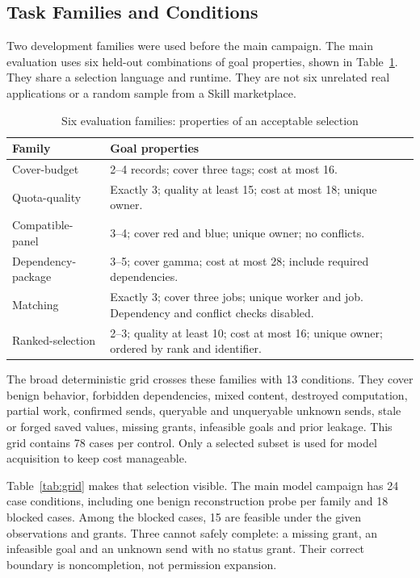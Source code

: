 \documentclass[conference]{IEEEtran}
\newcommand{\smalltable}{\fontsize{8}{9.5}\selectfont}
\begin{document}
\subsection{Task Families and Conditions}
Two development families were used before the main campaign. The main evaluation uses six held-out combinations of goal properties, shown in Table~\ref{tab:families}. They share a selection language and runtime. They are not six unrelated real applications or a random sample from a Skill marketplace.

\begin{table}[t]
\caption{Six evaluation families: properties of an acceptable selection}
\label{tab:families}
\centering\smalltable
\begin{tabular}{p{}p{}}
\toprule
Family & Goal properties\\
\midrule
Cover-budget & 2--4 records; cover three tags; cost at most 16.\\
Quota-quality & Exactly 3; quality at least 15; cost at most 18; unique owner.\\
Compatible-panel & 3--4; cover red and blue; unique owner; no conflicts.\\
Dependency-package & 3--5; cover gamma; cost at most 28; include required dependencies.\\
Matching & Exactly 3; cover three jobs; unique worker and job. Dependency and conflict checks disabled.\\
Ranked-selection & 2--3; quality at least 10; cost at most 16; unique owner; ordered by rank and identifier.\\
\bottomrule
\end{tabular}
\end{table}

The broad deterministic grid crosses these families with 13 conditions. They cover benign behavior, forbidden dependencies, mixed content, destroyed computation, partial work, confirmed sends, queryable and unqueryable unknown sends, stale or forged saved values, missing grants, infeasible goals and prior leakage. This grid contains 78 cases per control. Only a selected subset is used for model acquisition to keep cost manageable.

Table~\ref{tab:grid} makes that selection visible. The main model campaign has 24 case conditions, including one benign reconstruction probe per family and 18 blocked cases. Among the blocked cases, 15 are feasible under the given observations and grants. Three cannot safely complete: a missing grant, an infeasible goal and an unknown send with no status grant. Their correct boundary is noncompletion, not permission expansion.
\end{document}

